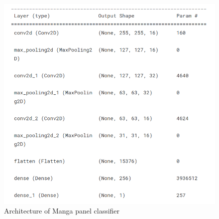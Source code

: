 \begin{figure}[hp]
  \centering
  \includegraphics[width=1\textwidth]{chapter/output/classifier-summary.png}
  \caption{Architecture of Manga panel classifier}
  \label{fig:classifier}
\end{figure}


